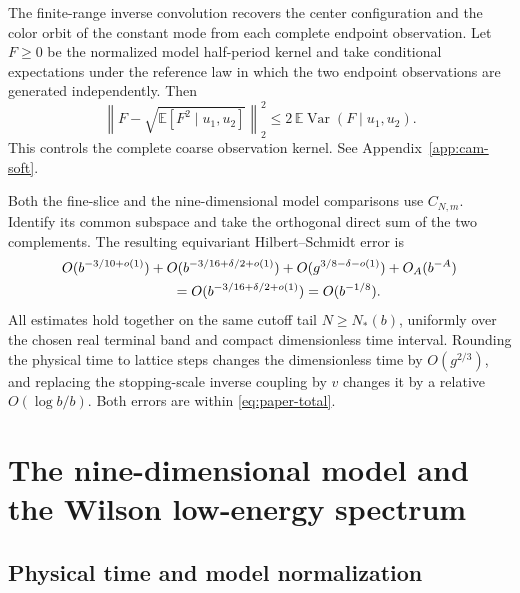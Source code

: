 \documentclass[11pt,a4paper]{article}
\numberwithin{equation}{section}
\begin{document}
The finite-range inverse convolution recovers the center configuration and the color orbit of the constant mode from each complete endpoint observation. Let \(F\ge0\) be the normalized model half-period kernel and take conditional expectations under the reference law in which the two endpoint observations are generated independently. Then
\[
 \left\|F-\sqrt{\mathbb E[F^2\mid u_1,u_2]}\right\|_2^2
       \le 2\,\mathbb E\operatorname{Var}(F\mid u_1,u_2).
\]
This controls the complete coarse observation kernel. See Appendix~\ref{app:cam-soft}.

Both the fine-slice and the nine-dimensional model comparisons use \(C_{N,m}\). Identify its common subspace and take the orthogonal direct sum of the two complements. The resulting equivariant Hilbert--Schmidt error is
\begin{equation}
 \begin{split}
  &O(b^{-3/10+o(1)})
   +O(b^{-3/16+\delta/2+o(1)})
   +O(g^{3/8-\delta-o(1)})+O_A(b^{-A})\\
  &\hspace{28mm}=O(b^{-3/16+\delta/2+o(1)})=O(b^{-1/8}).
 \end{split}
 \label{eq:paper-total}
\end{equation}
All estimates hold together on the same cutoff tail \(N\ge N_*(b)\), uniformly over the chosen real terminal band and compact dimensionless time interval. Rounding the physical time to lattice steps changes the dimensionless time by \(O(g^{2/3})\), and replacing the stopping-scale inverse coupling by \(v\) changes it by a relative \(O(\log b/b)\). Both errors are within \eqref{eq:paper-total}.

\section{The nine-dimensional model and the Wilson low-energy spectrum}
\label{sec:soft-spectrum}

\subsection{Physical time and model normalization}
\end{document}
